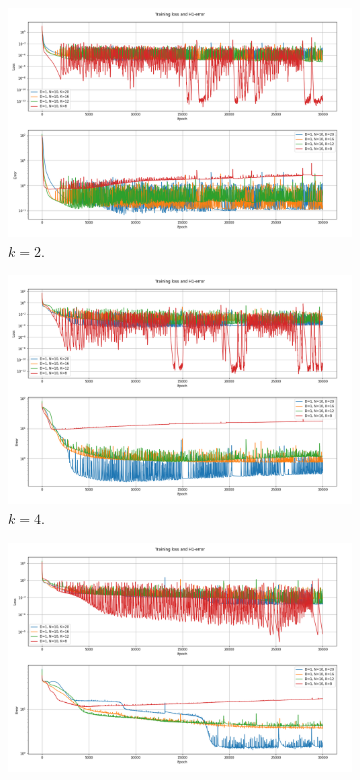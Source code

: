 \begin{figure}[h!]
    \centering
    \begin{subfigure}[b]{0.48\textwidth}
        \includegraphics[width=\textwidth]{img/VPINN-Comparison-k2increaseK.png}
        \caption{$k=2$.}
        \label{fig:vpinnsk2increaseK}
    \end{subfigure}
    \hfill
    \begin{subfigure}[b]{0.48\textwidth}
        \includegraphics[width=\textwidth]{img/VPINN-Comparison-k4increaseK.png}
        \caption{$k=4$.}
        \label{fig:vpinnsk4increaseK}
    \end{subfigure}
    \vfill
    \begin{subfigure}[b]{0.48\textwidth}
        \includegraphics[width=\textwidth]{img/VPINN-Comparison-k6increaseK.png}

\end{subfigure}
\end{figure}
